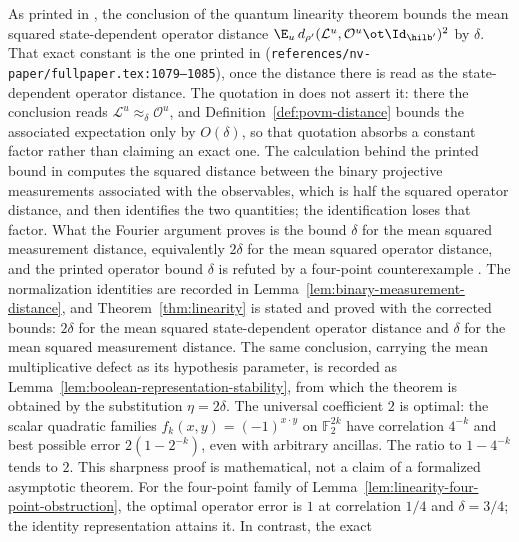 \begin{remark}
	\label{rem:linearity-distance-normalization}
	As printed in \cite{Natarajan2017Linearity}, the conclusion of the quantum
	linearity theorem bounds the mean squared state-dependent operator distance
	$\E_u \, d_{\rho'}(\mathcal{L}^u, \mathcal{O}^u \ot \Id_{\hilb'})^2$ by
	$\delta$. That exact constant is the one printed in
	\cite[Theorem~10]{Natarajan2017Linearity}
	(\texttt{references/nv-paper/fullpaper.tex:1079--1085}), once the distance
	there is read as the state-dependent operator distance. The quotation in
	\cite{Ji2020MIPStar} does not assert it: there the conclusion reads
	$\mathcal{L}^u \approx_\delta \mathcal{O}^u$, and
	Definition~\ref{def:povm-distance} bounds the associated expectation only
	by $O(\delta)$, so that quotation absorbs a constant factor rather than
	claiming an exact one. The calculation behind the printed bound in
	\cite[Section~3.1]{Natarajan2017Linearity} computes the squared distance
	between the binary projective measurements associated with the
	observables, which is half the squared operator distance, and then
	identifies the two quantities; the identification loses that factor. What
	the Fourier argument proves is the bound $\delta$ for the mean squared
	measurement distance, equivalently $2\delta$ for the mean squared operator
	distance, and the printed operator bound $\delta$ is refuted by a
	four-point counterexample
	\cite{gap:qpbt_linearity-distance-normalization}. The normalization
	identities are recorded in Lemma~\ref{lem:binary-measurement-distance},
	and Theorem~\ref{thm:linearity} is stated and proved with the corrected
	bounds: $2\delta$ for the mean squared state-dependent operator distance
	and $\delta$ for the mean squared measurement distance. The same
	conclusion, carrying the mean multiplicative defect as its hypothesis
	parameter, is recorded as
	Lemma~\ref{lem:boolean-representation-stability}, from which the theorem
	is obtained by the substitution $\eta = 2\delta$. The universal
	coefficient $2$ is optimal: the scalar quadratic families
	$f_k(x,y)=(-1)^{x\cdot y}$ on $\mathbb F_2^{2k}$ have correlation
	$4^{-k}$ and best possible error $2(1-2^{-k})$, even with arbitrary
	ancillas. The ratio to $1-4^{-k}$ tends to $2$. This sharpness proof is
	mathematical, not a claim of a formalized asymptotic theorem. For the
	four-point family of Lemma~\ref{lem:linearity-four-point-obstruction},
	the optimal operator error is $1$ at correlation $1/4$ and $\delta=3/4$;
	the identity representation attains it. In contrast, the exact

\end{remark}
